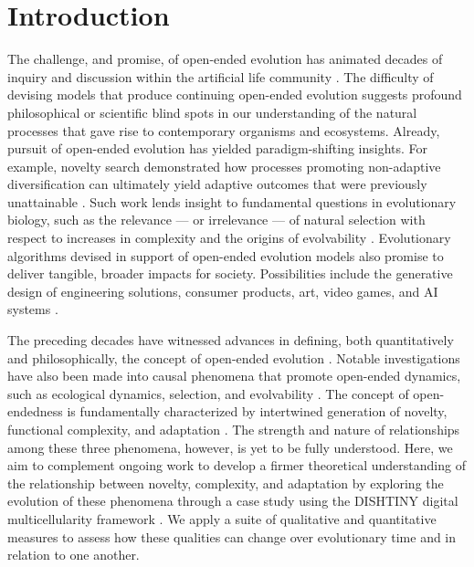 

\section{Introduction}

The challenge, and promise, of open-ended evolution has animated decades of inquiry and discussion within the artificial life community \citep{packard2019overview}.
The difficulty of devising models that produce continuing open-ended evolution suggests profound philosophical or scientific blind spots in our understanding of the natural processes that gave rise to contemporary organisms and ecosystems.
Already, pursuit of open-ended evolution has yielded paradigm-shifting insights.
For example, novelty search demonstrated how processes promoting non-adaptive diversification can ultimately yield adaptive outcomes that were previously unattainable \citep{lehman2011abandoning}.
Such work lends insight to fundamental questions in evolutionary biology, such as the relevance --- or irrelevance --- of natural selection with respect to increases in complexity \citep{lehman2012evolution, Lynch8597} and the origins of evolvability \citep{lehman2013evolvability,Kirschner8420}.
Evolutionary algorithms devised in support of open-ended evolution models also promise to deliver tangible, broader impacts for society.
Possibilities include the generative design of engineering solutions, consumer products, art, video games, and AI systems \citep{nguyen2015,stanley2019open}.

The preceding decades have witnessed advances in defining, both quantitatively and philosophically, the concept of open-ended evolution \citep{lehman2012beyond,dolson2019modes,bedau1998classification}. 
Notable investigations have also been made into causal phenomena that promote open-ended dynamics, such as ecological dynamics, selection, and evolvability \citep{dolson2019constructive,soros2014identifying,huizinga2018emergence}.
The concept of open-endedness is fundamentally characterized by intertwined generation of novelty, functional complexity, and adaptation \citep{taylor2016open}.
The strength and nature of relationships among these three phenomena, however, is yet to be fully understood.
Here, we aim to complement ongoing work to develop a firmer theoretical understanding of the relationship between novelty, complexity, and adaptation by exploring the evolution of these phenomena through a case study using the DISHTINY digital multicellularity framework .
We apply a suite of qualitative and quantitative measures to assess how these qualities can change over evolutionary time and in relation to one another.
